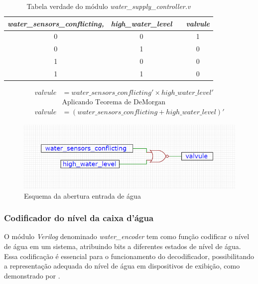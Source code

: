 \documentclass[
	article,			%
	11pt,				%
	oneside,			%
	a4paper,			%
	english,			%
	brazil,				%
	sumario=tradicional
	]{abntex2}
\begin{document}
\begin{table}[h]
\centering
\begin{tabular}{|c|c|c|c|}
\hline
\textit{water\_sensors\_conflicting,} & \multicolumn{1}{l|}{\textit{high\_water\_level}} & \textit{} & \textit{valvule} \\ \hline
0 & 0 &  & 1 \\ \hline
0 & 1 &  & 0 \\ \hline
1 & 0 &  & 0 \\ \hline
1 & 1 &  & 0 \\ \hline
\end{tabular}
\caption{Tabela verdade do módulo \textit{water\_supply\_controller.v}}
\label{tab:water-supply}
\end{table}


\begin{equation}
\begin{split}
valvule &= water\_sensors\_conflicting' \times high\_water\_level'  \\
& \text{Aplicando Teorema de DeMorgan} \\
valvule &= (water\_sensors\_conflicting + high\_water\_level)'
\label{math:supply}
\end{split}
\end{equation}

\begin{figure}[H]
    \centering
    \includegraphics[width=0.75\linewidth]{Ve.png}
    \caption{Esquema da abertura entrada de água}
    \label{fig:ve}
\end{figure}

\subsubsection{Codificador do nível da caixa d’água}

O módulo \textit{Verilog} denominado \textit{water\_encoder} tem como função codificar o nível de água em um sistema, atribuindo bits a diferentes estados de nível de água. 
Essa codificação é essencial para o funcionamento do decodificador, possibilitando a representação adequada do nível de água em dispositivos de exibição, como demonstrado por \cite{floyd_2007_funes}.
\end{document}
